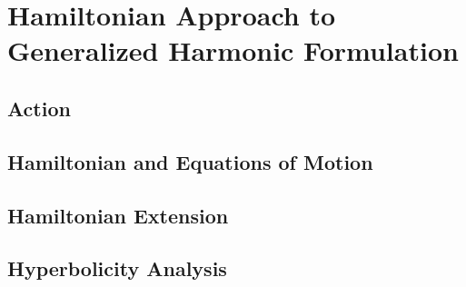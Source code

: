 \chapter{Hamiltonian Approach to Generalized Harmonic Formulation}
\section{Action}
\section{Hamiltonian and Equations of Motion}
\section{Hamiltonian Extension}
\section{Hyperbolicity Analysis}
